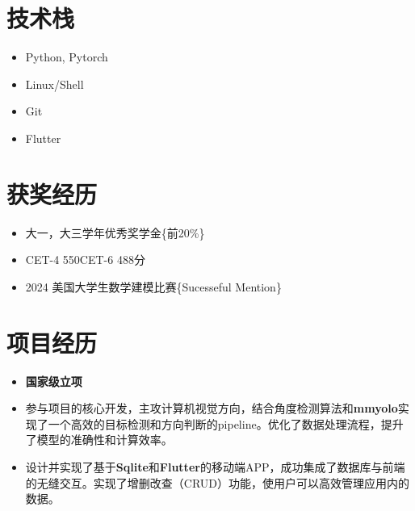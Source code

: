 \documentclass{resume}
\begin{document}
\section{技术栈}
\begin{itemize}[parsep=0.5ex]
    \item Python, Pytorch
    \item Linux/Shell
    \item Git
    \item Flutter
  \end{itemize}


\section{获奖经历}
\begin{itemize}
    \item 大一，大三学年优秀奖学金\{前20\%\}
    \item CET-4 550\quad CET-6 488分
    \item 2024 美国大学生数学建模比赛\{Sucesseful Mention\}
\end{itemize}

\section{项目经历}

\begin{itemize}[parsep=0.5ex]
  \item \textbf{国家级立项}
  \item 参与项目的核心开发，主攻计算机视觉方向，结合角度检测算法和\textbf{mmyolo}实现了一个高效的目标检测和方向判断的pipeline。优化了数据处理流程，提升了模型的准确性和计算效率。
\end{itemize}


\begin{itemize}[parsep=0.5ex]
  \item 设计并实现了基于\textbf{Sqlite}和\textbf{Flutter}的移动端APP，成功集成了数据库与前端的无缝交互。实现了增删改查（CRUD）功能，使用户可以高效管理应用内的数据。
\end{itemize}
\end{document}
